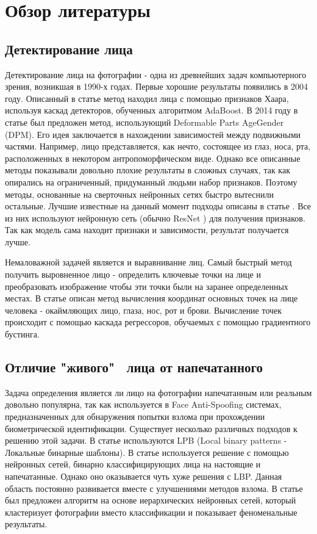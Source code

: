 \documentclass[a4paper,14pt]{extarticle}
\begin{document}
    \section{Обзор литературы}

    \subsection{Детектирование лица}
    Детектирование лица на фотографии - одна из древнейших задач компьютерного зрения, возникшая в 1990-х годах. Первые хорошие результаты появились в 2004 году. Описанный в статье \cite{face_detection} метод находил лица с помощью признаков Хаара, используя каскад детекторов, обученных алгоритмом AdaBoost. В 2014 году в статье \cite{face_detection2} был предложен метод, использующий Deformable Parts AgeGender (DPM). Его идея заключается в нахождении зависимостей между подвижными частями. Например, лицо представляется, как нечто, состоящее из глаз, носа, рта, расположенных в некотором антропоморфическом виде. Однако все описанные методы показывали довольно плохие результаты в сложных случаях, так как опирались на ограниченный, придуманный людьми набор признаков. Поэтому методы, основанные на сверточных нейронных сетях быстро вытеснили остальные. Лучшие известные на данный момент подходы описаны в статье \cite{face_detection3}. Все из них используют нейронную сеть (обычно ResNet \cite{resnet}) для получения признаков. Так как модель сама находит признаки и зависимости, результат получается лучше.
    \par Немаловажной задачей является и выравнивание лиц. Самый быстрый метод получить выровненное лицо - определить ключевые точки на лице и преобразовать изображение чтобы эти точки были на заранее определенных местах. В статье \cite{align} описан метод вычисления координат основных точек на лице человека - окаймляющих лицо, глаза, нос, рот и брови. Вычисление точек происходит с помощью каскада регрессоров, обучаемых с помощью градиентного бустинга.

    \subsection{Отличие "живого" \, лица от напечатанного}
    Задача определения является ли лицо на фотографии напечатанным или реальным довольно популярна, так как используется в Face Anti-Spoofing системах, предназначенных для обнаружения попытки взлома при прохождении биометрической идентификации. Существует несколько различных подходов к решению этой задачи. В статье \cite{lbp} используются LPB (Local binary patterns - Локальные бинарные шаблоны). В статье \cite{lbp2} используется решение с помощью нейронных сетей, бинарно классифицирующих лица на настоящие и напечатанные. Однако оно оказывается чуть хуже решения с LBP. Данная область постоянно развивается вместе с улучшениями методов взлома. В статье \cite{lbp3} был предложен алгоритм на основе иерархических нейронных сетей, который кластеризует фотографии вместо классификации и показывает феноменальные результаты.
\end{document}
